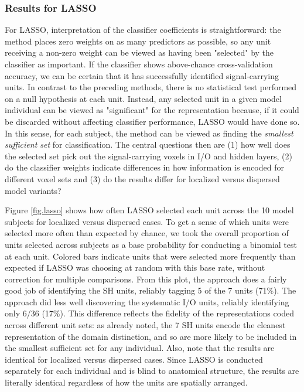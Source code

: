 \subsubsection{Results for LASSO}
For LASSO, interpretation of the classifier coefficients is straightforward: the method places zero weights on as many predictors as possible, so any unit receiving a non-zero weight can be viewed as having been "selected" by the classifier as important. If the classifier shows above-chance cross-validation accuracy, we can be certain that it has successfully identified signal-carrying units. In contrast to the preceding methods, there is no statistical test performed on a null hypothesis at each unit. Instead, any selected unit in a given model individual can be viewed as "significant" for the representation because, if it could be discarded without affecting classifier performance, LASSO would have done so. In this sense, for each subject, the method can be viewed as finding the {\em smallest sufficient set} for classification. The central questions then are (1) how well does the selected set pick out the signal-carrying voxels in I/O and hidden layers, (2) do the classifier weights indicate differences in how information is encoded for different voxel sets and (3) do the results differ for localized versus dispersed model variants?

Figure \ref{fig.lasso} shows how often LASSO selected each unit across the 10 model subjects for localized versus dispersed cases. To get a sense of which units were selected more often than expected by chance, we took the overall proportion of units selected across subjects as a base probability for conducting a binomial test at each unit. Colored bars indicate units that were selected more frequently than expected if LASSO was choosing at random with this base rate, without correction for multiple comparisons. From this plot, the approach does a fairly good job of identifying the SH units, reliably tagging 5 of the 7 units (71\%). The approach did less well discovering the systematic I/O units, reliably identifying only 6/36 (17\%). This difference reflects the fidelity of the representations coded across different unit sets: as already noted, the 7 SH units encode the cleanest representation of the domain distinction, and so are more likely to be included in the smallest sufficient set for any individual. Also, note that the results are identical for localized versus dispersed cases. Since LASSO is conducted separately for each individual and is blind to anatomical structure, the results are literally identical regardless of how the units are spatially arranged.


